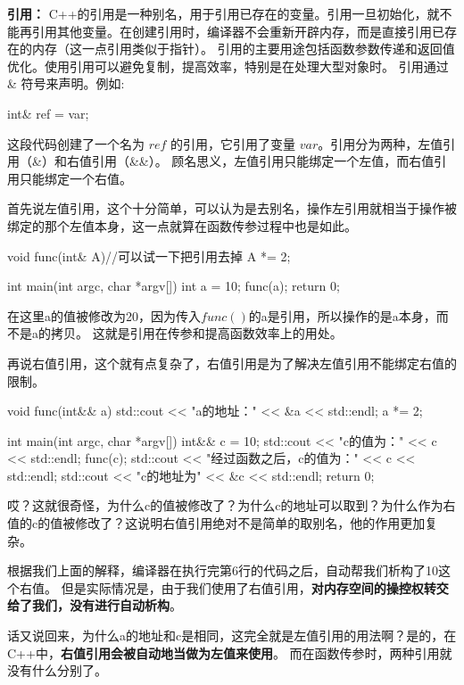 \textbf{引用：}
C++的引用是一种别名，用于引用已存在的变量。引用一旦初始化，就不能再引用其他变量。在创建引用时，编译器不会重新开辟内存，而是直接引用已存在的内存（这一点引用类似于指针）。
引用的主要用途包括函数参数传递和返回值优化。使用引用可以避免复制，提高效率，特别是在处理大型对象时。
引用通过 \& 符号来声明。例如:
\begin{tcode}
int& ref = var;
\end{tcode}
这段代码创建了一个名为 $ref$ 的引用，它引用了变量 $var$。引用分为两种，左值引用（\&）和右值引用（\&\&）。
顾名思义，左值引用只能绑定一个左值，而右值引用只能绑定一个右值。

首先说左值引用，这个十分简单，可以认为是去别名，操作左引用就相当于操作被绑定的那个左值本身，这一点就算在函数传参过程中也是如此。
\begin{tcode}
void func(int& A){//可以试一下把引用去掉
    A *= 2;
}

int main(int argc, char *argv[]) {
    int a = 10;
    func(a);
    return 0;
}
\end{tcode}
在这里a的值被修改为20，因为传入$func()$的a是引用，所以操作的是a本身，而不是a的拷贝。
这就是引用在传参和提高函数效率上的用处。

再说右值引用，这个就有点复杂了，右值引用是为了解决左值引用不能绑定右值的限制。
\begin{tcode}
void func(int&& a){
    std::cout << "a的地址：" << &a << std::endl;
    a *= 2;
}

int main(int argc, char *argv[]) {
    int&& c = 10;
    std::cout << "c的值为：" << c << std::endl;
    func(c);
    std::cout << "经过函数之后，c的值为：" << c << std::endl;
    std::cout << "c的地址为" << &c << std::endl;
    return 0;
}
\end{tcode}

哎？这就很奇怪，为什么c的值被修改了？为什么c的地址可以取到？为什么作为右值的c的值被修改了？这说明右值引用绝对不是简单的取别名，他的作用更加复杂。

根据我们上面的解释，编译器在执行完第6行的代码之后，自动帮我们析构了10这个右值。
但是实际情况是，由于我们使用了右值引用，\textbf{对内存空间的操控权转交给了我们，没有进行自动析构}。

话又说回来，为什么a的地址和c是相同，这完全就是左值引用的用法啊？是的，在C++中，\textbf{右值引用会被自动地当做为左值来使用}。
而在函数传参时，两种引用就没有什么分别了。

